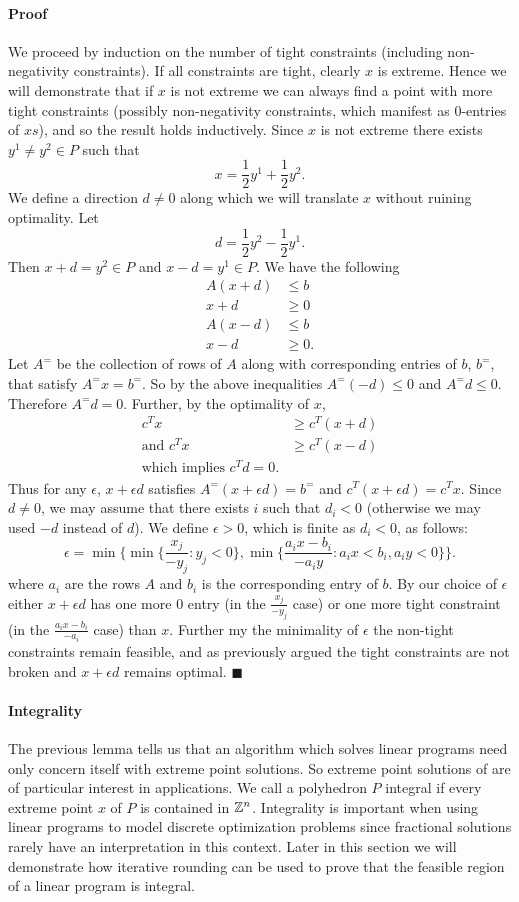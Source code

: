\paragraph{Proof}
We proceed by induction on the number of tight constraints (including non-negativity constraints). If all constraints are tight, clearly $x$ is extreme. Hence we will demonstrate that if $x$ is not extreme we can always find a point with more tight constraints (possibly non-negativity constraints, which manifest as $0$-entries of $xs$), and so the result holds inductively. Since $x$ is not extreme there exists $y^1 \neq y^2 \in P$ such that $$x = \frac{1}{2} y^1 + \frac{1}{2}y^2.$$
We define a direction $d\neq 0$ along which we will translate $x$ without ruining optimality. Let
$$ d = \frac{1}{2}y^2 - \frac{1}{2} y^1.$$
Then $x + d = y^2 \in P$ and $x - d = y^1 \in P$. We have the following
\begin{align*} A(x+d) &\leq b \\ x+d &\geq 0 \\
A(x-d) &\leq b \\ x-d &\geq 0 .\end{align*}
Let $A^=$ be the collection of rows of $A$ along with corresponding entries of $b$, $b^=$, that satisfy $A^= x = b^=$. So by the above inequalities $A^=(-d) \leq 0$ and $A^=d \leq 0$. Therefore $A^=d = 0$. Further, by the optimality of $x$,
\begin{align*}
c^Tx &\geq c^T(x+d) \\
\text{and } c^Tx &\geq c^T(x-d) \\
\text{which implies } c^Td = 0.
\end{align*}
Thus for any $\epsilon$, $x+\epsilon d$ satisfies $A^=(x+\epsilon d) = b^=$ and $c^T(x+\epsilon d) = c^Tx$. Since $d \neq 0$, we may assume that there exists $i$ such that $d_i < 0$ (otherwise we may used $-d$ instead of $d$). We define $\epsilon > 0$, which is finite as $d_i < 0$, as follows:
$$ \epsilon = \min\{ \min\{\frac{x_j}{-y_j}: y_j < 0\}, \min \{\frac{a_i x - b_i}{-a_iy}: a_i x < b_i, a_i y < 0 \}\}.$$
where $a_i$ are the rows $A$ and $b_i$ is the corresponding entry of $b$. By our choice of $\epsilon$ either $x+\epsilon d$ has one more $0$ entry (in the $\frac{x_j}{-y_j}$ case) or one more tight constraint (in the $\frac{a_i x - b_i}{-a_i}$ case) than $x$. Further my the minimality of $\epsilon$ the non-tight constraints remain feasible, and as previously argued the tight constraints are not broken and $x + \epsilon d$ remains optimal. $\blacksquare$
\paragraph{Integrality}
The previous lemma tells us that an algorithm which solves linear programs need only concern itself with extreme point solutions. So extreme point solutions of are of particular interest in applications. We call a polyhedron $P$ integral if every extreme point $x$ of $P$ is contained in $\mathbb{Z}^n$. Integrality is important when using linear programs to model discrete optimization problems since fractional solutions rarely have an interpretation in this context. Later in this section we will demonstrate how iterative rounding can be used to prove that the feasible region of a linear program is integral.
